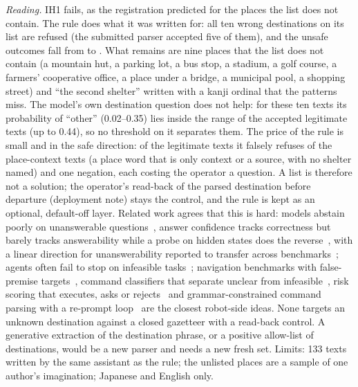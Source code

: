 \emph{Reading.} IH1 fails, as the registration predicted for the places the list does not contain. The rule does what it was written for: all ten wrong destinations on its list are refused (the submitted parser accepted five of them), and the unsafe outcomes fall from \IHUnsafeV{} to \IHUnsafe{}. What remains are nine places that the list does not contain (a mountain hut, a parking lot, a bus stop, a stadium, a golf course, a farmers' cooperative office, a place under a bridge, a municipal pool, a shopping street) and ``the second shelter'' written with a kanji ordinal that the patterns miss. The model's own destination question does not help: for these ten texts its probability of ``other'' (0.02--0.35) lies inside the range of the accepted legitimate texts (up to 0.44), so no threshold on it separates them. The price of the rule is small and in the safe direction: of the legitimate texts it falsely refuses \IHContextBad{} of the place-context texts (a place word that is only context or a source, with no shelter named) and one negation, each costing the operator a question. A list is therefore not a solution; the operator's read-back of the parsed destination before departure (deployment note) stays the control, and the rule is kept as an optional, default-off layer. Related work agrees that this is hard: models abstain poorly on unanswerable questions~\cite{kirichenko2025abstentionbench}, answer confidence tracks correctness but barely tracks answerability while a probe on hidden states does the reverse~\cite{wagner2026twoaxes}, with a linear direction for unanswerability reported to transfer across benchmarks~\cite{lavi2025linear}; agents often fail to stop on infeasible tasks~\cite{cheng2026feasibility}; navigation benchmarks with false-premise targets~\cite{su2026vlnnf}, command classifiers that separate unclear from infeasible~\cite{park2023clara}, risk scoring that executes, asks or rejects~\cite{sobczak2026trust} and grammar-constrained command parsing with a re-prompt loop~\cite{huo2026grammarllm} are the closest robot-side ideas. None targets an unknown destination against a closed gazetteer with a read-back control. A generative extraction of the destination phrase, or a positive allow-list of destinations, would be a new parser and needs a new fresh set. Limits: 133 texts written by the same assistant as the rule; the unlisted places are a sample of one author's imagination; Japanese and English only.
